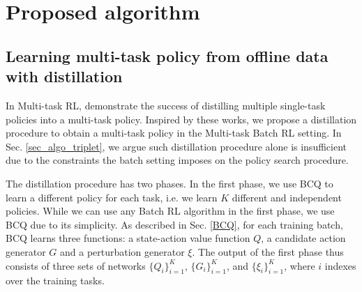 \section{Proposed algorithm}
\label{sec_algo}

\subsection{Learning multi-task policy from offline data with distillation}\label{sec_algo_distillation}

In Multi-task RL, \cite{rusu2015policy, teh2017distral, ghosh2017divide,czarnecki2019distilling, ActorMimicParisotto2015} demonstrate the success of distilling multiple single-task policies into a multi-task policy. Inspired by these works, we propose a distillation procedure to obtain a multi-task policy in the Multi-task Batch RL setting. In Sec. \ref{sec_algo_triplet}, we argue such distillation procedure alone is insufficient due to the constraints the batch setting imposes on the policy search procedure.

The distillation procedure has two phases.
In the first phase, we use BCQ to learn a different policy for each task, i.e. we learn $K$ different and independent policies. While we can use any Batch RL algorithm in the first phase, we use BCQ due to its simplicity.
As described in Sec. \ref{BCQ},
for each training batch, BCQ learns three functions: a state-action value function $Q$, a candidate action generator $G$ and a perturbation generator $\xi$. The output of the first phase thus consists of three sets of networks $\{Q_i\}^K_{i=1}$, $\{G_i\}^K_{i=1}$, and $\{\xi_i\}^K_{i=1}$, where $i$ indexes over the training tasks.

